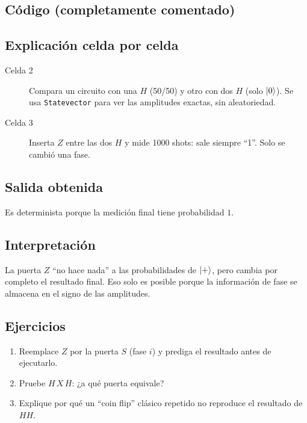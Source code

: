 \subsection{Código (completamente comentado)}


\subsection{Explicación celda por celda}
\begin{description}
  \item[Celda 2] Compara un circuito con una $H$ (50/50) y otro con dos $H$
    (solo $\left|0\right\rangle$). Se usa \texttt{Statevector} para ver las amplitudes
    exactas, sin aleatoriedad.
  \item[Celda 3] Inserta $Z$ entre las dos $H$ y mide 1000 shots: sale
    siempre ``1''. Solo se cambió una fase.
\end{description}

\subsection{Salida obtenida}

Es determinista porque la medición final tiene probabilidad $1$.

\subsection{Interpretación}
La puerta $Z$ ``no hace nada'' a las probabilidades de $\left|+\right\rangle$, pero cambia
por completo el resultado final. Eso solo es posible porque la información
de fase se almacena en el signo de las amplitudes.

\subsection{Ejercicios}
\begin{enumerate}
  \item Reemplace $Z$ por la puerta $S$ (fase $i$) y prediga el resultado
    antes de ejecutarlo.
  \item Pruebe $H\,X\,H$: ¿a qué puerta equivale?
  \item Explique por qué un ``coin flip'' clásico repetido no reproduce el
    resultado de $HH$.
\end{enumerate}


